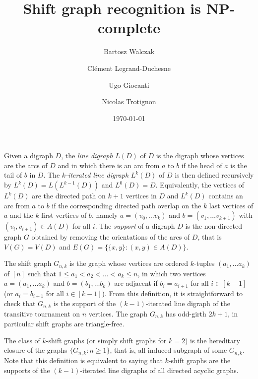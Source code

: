 \documentclass[11pt,a4aper]{article}
\title{Shift graph recognition is NP-complete}
\date{\today}
\author{
Bartosz Walczak\footnotemark[1] \and 
Cl\'ement Legrand-Duchesne\footnotemark[1]\and
Ugo Giocanti\footnotemark[1] \and
Nicolas Trotignon\footnotemark[4]
}
\theoremstyle{definition}
\renewcommand{\ge}{\geqslant}
\renewcommand{\le}{\leqslant}
\begin{document}
\maketitle

\renewcommand{\thefootnote}{\fnsymbol{footnote}} %

\footnotetext[2]{}

\renewcommand{\thefootnote}{\arabic{footnote}} %

\begin{abstract}
\end{abstract}


Given a digraph $D$, the \emph{line digraph} $L(D)$ of $D$ is the digraph whose
vertices are the arcs of $D$ and in which there is an arc from $a$ to $b$ if the
head of $a$ is the tail of $b$ in $D$. The \emph{$k$-iterated line digraph} $L^k(D)$
of $D$ is then defined recursively by $L^k(D) = L(L^{k-1}(D))$ and $L^0(D) = D$.
Equivalently, the vertices of $L^k(D)$ are the directed path on $k+1$ vertices
in $D$ and $L^k(D)$ contains an arc from $a$ to $b$ if the corresponding
directed path overlap on the $k$ last vertices of $a$ and the $k$ first vertices
of $b$, namely $a = (v_0, \dots v_k)$ and $b=(v_1, \dots v_{k+1})$ with
$(v_i,v_{i+1}) \in A(D)$ for all $i$. The \emph{support} of a digraph $D$ is the
non-directed graph $G$ obtained by removing the orientations of the arcs of $D$,
that is $V(G) = V(D)$ and $E(G) = \{\{x,y\} \colon (x,y) \in A(D)\}$. 

The shift graph $G_{n,k}$ is the graph whose vertices are ordered $k$-tuples
$(a_1, \dots a_k)$ of $[n]$ such that $1 \le a_1 < a_2 < \dots < a_k \le n$, in
which two vertices $a = (a_1, \dots a_k)$ and $b = (b_1, \dots b_k)$ are
adjacent if $b_i = a_{i+1}$ for all $i \in [k-1]$ (or $a_i = b_{i+1}$ for all
$i \in [k-1]$). From this definition, it is straightforward to check that
$G_{n,k}$ is the support of the $(k-1)$-iterated line digraph of the transitive
tournament on $n$ vertices. The graph $G_{n,k}$ has odd-girth $2k+1$, in
particular shift graphs are triangle-free.

The class of $k$-shift graphs (or simply shift graphs for $k=2$) is the
hereditary closure of the graphs $\{G_{n,k} : n \ge 1\}$, that is, all induced
subgraph of some $G_{n,k}$. Note that this definition is equivalent to saying
that $k$-shift graphs are the supports of the $(k-1)$-iterated line digraphs of
all directed acyclic graphs.
\end{document}
